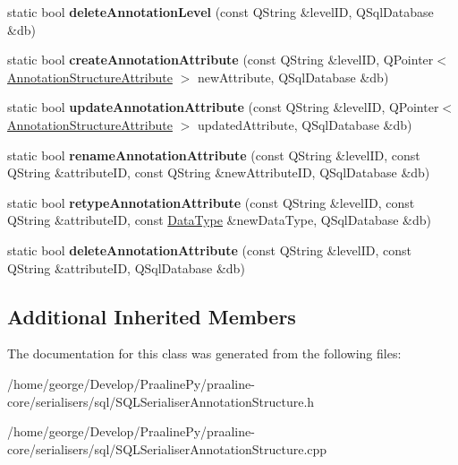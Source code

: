 \begin{DoxyCompactItemize}
\mbox{\label{class_s_q_l_serialiser_annotation_structure_a7d7a26ebad5c1396a04a5422512f8fdf}} 
static bool {\bfseries delete\+Annotation\+Level} (const Q\+String \&level\+ID, Q\+Sql\+Database \&db)
\item 
\mbox{\label{class_s_q_l_serialiser_annotation_structure_ae2b0069f1c0f7dd5e9403b4d76757b19}} 
static bool {\bfseries create\+Annotation\+Attribute} (const Q\+String \&level\+ID, Q\+Pointer$<$ \hyperlink{class_annotation_structure_attribute}{Annotation\+Structure\+Attribute} $>$ new\+Attribute, Q\+Sql\+Database \&db)
\item 
\mbox{\label{class_s_q_l_serialiser_annotation_structure_a536e82beb48316c8ceefc8351bdaa1f5}} 
static bool {\bfseries update\+Annotation\+Attribute} (const Q\+String \&level\+ID, Q\+Pointer$<$ \hyperlink{class_annotation_structure_attribute}{Annotation\+Structure\+Attribute} $>$ updated\+Attribute, Q\+Sql\+Database \&db)
\item 
\mbox{\label{class_s_q_l_serialiser_annotation_structure_a6fa2d5dc24b1f1222e607312fa5c6e0e}} 
static bool {\bfseries rename\+Annotation\+Attribute} (const Q\+String \&level\+ID, const Q\+String \&attribute\+ID, const Q\+String \&new\+Attribute\+ID, Q\+Sql\+Database \&db)
\item 
\mbox{\label{class_s_q_l_serialiser_annotation_structure_adffd32767005854cdd0d2af47214e6db}} 
static bool {\bfseries retype\+Annotation\+Attribute} (const Q\+String \&level\+ID, const Q\+String \&attribute\+ID, const \hyperlink{class_data_type}{Data\+Type} \&new\+Data\+Type, Q\+Sql\+Database \&db)
\item 
\mbox{\label{class_s_q_l_serialiser_annotation_structure_a1b3ed2ed75a8e7b5c0acdabde368e8af}} 
static bool {\bfseries delete\+Annotation\+Attribute} (const Q\+String \&level\+ID, const Q\+String \&attribute\+ID, Q\+Sql\+Database \&db)
\end{DoxyCompactItemize}
\subsection*{Additional Inherited Members}


The documentation for this class was generated from the following files\+:\begin{DoxyCompactItemize}
\item 
/home/george/\+Develop/\+Praaline\+Py/praaline-\/core/serialisers/sql/S\+Q\+L\+Serialiser\+Annotation\+Structure.\+h\item 
/home/george/\+Develop/\+Praaline\+Py/praaline-\/core/serialisers/sql/S\+Q\+L\+Serialiser\+Annotation\+Structure.\+cpp\end{DoxyCompactItemize}

